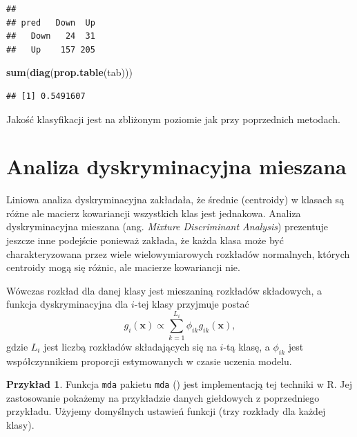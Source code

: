 \documentclass[
]{book}
\newenvironment{Shaded}{\begin{snugshade}}{\end{snugshade}}
\newcommand{\FunctionTok}[1]{\textcolor[rgb]{0.13,0.29,0.53}{\textbf{#1}}}
\newcommand{\NormalTok}[1]{#1}
\theoremstyle{plain}
\theoremstyle{definition}
\theoremstyle{definition}
\theoremstyle{definition}
\newtheorem{example}{Przykład}[chapter]
\theoremstyle{definition}
\theoremstyle{definition}
\theoremstyle{remark}
\begin{document}
\begin{verbatim}
##       
## pred   Down  Up
##   Down   24  31
##   Up    157 205
\end{verbatim}

\begin{Shaded}
\begin{Highlighting}[]
\FunctionTok{sum}\NormalTok{(}\FunctionTok{diag}\NormalTok{(}\FunctionTok{prop.table}\NormalTok{(tab)))}
\end{Highlighting}
\end{Shaded}

\begin{verbatim}
## [1] 0.5491607
\end{verbatim}

Jakość klasyfikacji jest na zbliżonym poziomie jak przy poprzednich metodach.

\section{Analiza dyskryminacyjna mieszana}\label{analiza-dyskryminacyjna-mieszana}

Liniowa analiza dyskryminacyjna zakładała, że średnie (centroidy) w klasach są różne ale macierz kowariancji wszystkich klas jest jednakowa. Analiza dyskryminacyjna mieszana (ang. \emph{Mixture Discriminant Analysis}) prezentuje jeszcze inne podejście ponieważ zakłada, że każda klasa może być charakteryzowana przez wiele wielowymiarowych rozkładów normalnych, których centroidy mogą się różnic, ale macierze kowariancji nie.

Wówczas rozkład dla danej klasy jest mieszaniną rozkładów składowych, a funkcja dyskryminacyjna dla \(i\)-tej klasy przyjmuje postać
\begin{equation}
    g_i(\boldsymbol x)\propto \sum_{k=1}^{L_i}\phi_{ik}g_{ik}(\boldsymbol x),
\end{equation}
gdzie \(L_i\) jest liczbą rozkładów składających się na \(i\)-tą klasę, a \(\phi_{ik}\) jest współczynnikiem proporcji estymowanych w czasie uczenia modelu.

\begin{example}
\protect\hypertarget{exm:mda}{}\label{exm:mda}Funkcja \texttt{mda} pakietu \texttt{mda} () jest implementacją tej techniki w R. Jej zastosowanie pokażemy na przykładzie danych giełdowych z poprzedniego przykładu. Użyjemy domyślnych ustawień funkcji (trzy rozkłady dla każdej klasy).
\end{example}
\end{document}
